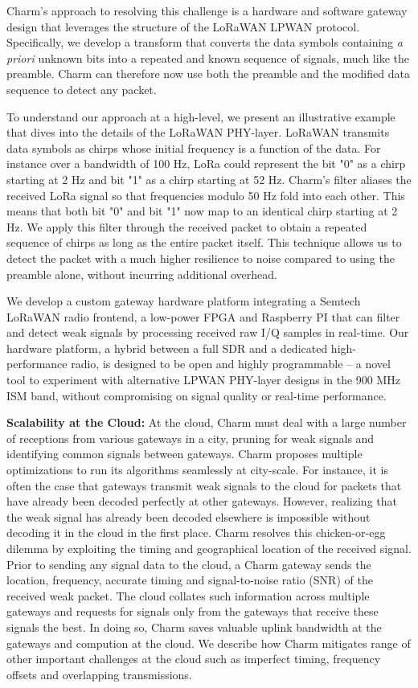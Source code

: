 Charm's approach to resolving this challenge is a hardware and software gateway
design that leverages the structure of the LoRaWAN LPWAN protocol.
Specifically, we develop a transform that converts the data symbols containing
\textit{a priori} unknown bits into a repeated and known sequence of signals,
much like the preamble. Charm can therefore now use both the preamble and the
modified data sequence to detect any packet.

To understand our approach at a high-level, we present an illustrative example
that dives into the details of the LoRaWAN PHY-layer. LoRaWAN transmits data
symbols as chirps whose initial frequency is a function of the data. For
instance over a bandwidth of 100 Hz, LoRa could represent the bit "0" as a
chirp starting at 2 Hz and bit "1" as a chirp starting at 52 Hz. Charm's
filter aliases the received LoRa signal so that frequencies modulo 50 Hz fold
into each other. This means that both bit "0" and bit "1" now map to an
identical chirp starting at 2 Hz. We apply this filter through the received
packet to obtain a repeated sequence of chirps as long as the entire packet
itself. This technique allows us to detect the packet with a much higher
resilience to noise compared to using the preamble alone, without incurring
additional overhead.

We develop a custom gateway hardware platform integrating a Semtech LoRaWAN
radio frontend, a low-power FPGA and Raspberry PI that can filter and detect
weak signals by processing received raw I/Q samples in real-time. Our hardware
platform, a hybrid between a full SDR and a dedicated high-performance radio,
is designed to be open and highly programmable -- a novel tool to experiment
with alternative LPWAN PHY-layer designs in the 900 MHz ISM band, without
compromising on signal quality or real-time performance.

\noindent \textbf{Scalability at the Cloud:} At the cloud, Charm must deal
with a large number of receptions from various gateways in a city, pruning for
weak signals and identifying common signals between gateways. Charm proposes
multiple optimizations to run its algorithms seamlessly at city-scale. For
instance, it is often the case that gateways transmit weak signals to the
cloud for packets that have already been decoded perfectly at other gateways.
However, realizing that the weak signal has already been decoded elsewhere is
impossible without decoding it in the cloud in the first place. Charm resolves
this chicken-or-egg dilemma by exploiting the timing and geographical location
of the received signal. Prior to sending any signal data to the cloud, a Charm
gateway sends the location, frequency, accurate timing and signal-to-noise
ratio (SNR) of the received weak packet. The cloud collates such information
across multiple gateways and requests for signals only from the gateways that
receive these signals the best. In doing so, Charm saves valuable uplink
bandwidth at the gateways and compution at the cloud. We describe how Charm
mitigates range of other important challenges at the cloud such as imperfect
timing, frequency offsets and overlapping transmissions.

